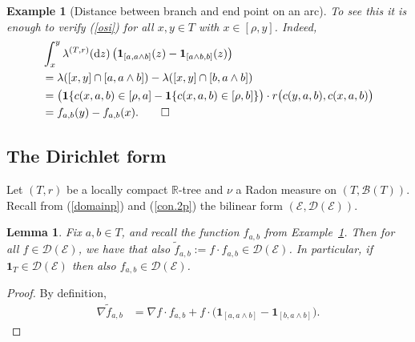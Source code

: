 \documentclass[11pt]{amsart}
\numberwithin{equation}{section}
\newtheorem{lemma}[definition]{Lemma}
\newtheorem{example}[definition]{Example}
\begin{document}
{\begin{example}[Distance between branch and end point on an arc]
To see this it is enough to verify (\ref{osi}) for all $x,y\in T$ with $x\in[\rho,y]$.
Indeed,\label{Exp:01}
{
\begin{equation}\label{e:yy}
\begin{aligned}
   &\int^y_x\lambda^{(T,r)}(\mathrm{d}z)\,\big(\mathbf{1}_{[a,a\wedge b]}(z)-\mathbf{1}_{[a\wedge b,b]}(z)\big)
  \\
 &=
   \lambda([x,y]\cap[a,a\wedge b])-\lambda([x,y]\cap[b,a\wedge b])
  \\
 &=
   \big(\mathbf{1}\{c(x,a,b)\in[\rho,a]-\mathbf{1}\{c(x,a,b)\in[\rho,b]\}\big)\cdot r\big(c(y,a,b),c(x,a,b)\big)
  \\
 &=
   f_{a,b}(y)-f_{a,b}(x).\mbox{\hfill$\qed$}
\end{aligned}
\end{equation}}
\end{example}{\smallskip}

\subsection{The Dirichlet form}
\label{Sub:form}
Let $(T,r)$ be a locally compact ${{\mathbb R}}$-tree and $\nu$ a {{\it} Radon measure} {on $(T,{\mathcal B}(T))$}.
Recall from (\ref{domainp}) and (\ref{con.2p}) the bilinear form $({\mathcal E},{\mathcal D}({\mathcal E}))$.
{
\begin{lemma} Fix $a,b\in T$, and recall the function $f_{a,b}$ from Example~\ref{Exp:01}.
Then for all $f\in {\mathcal D}({\mathcal E})$, we have that also $\tilde{f}_{a,b}:=f\cdot f_{a,b}\in  {\mathcal D}({\mathcal E})$.
\label{L:13}
In particular, if $\mathbf{1}_T\in {\mathcal D}({\mathcal E})$ then also $f_{a,b}\in  {\mathcal D}({\mathcal E})$.
\end{lemma}{\smallskip}

\begin{proof} By definition,
\begin{equation}\label{e:calcc}
\begin{aligned}
   \nabla\tilde{f}_{a,b}
 &=
   \nabla f\cdot f_{a,b}+f\cdot\big(\mathbf{1}_{[a,a\wedge b]}-\mathbf{1}_{[b,a\wedge b]}\big).
\end{aligned}
\end{equation}


\end{proof}}}
\end{document}
